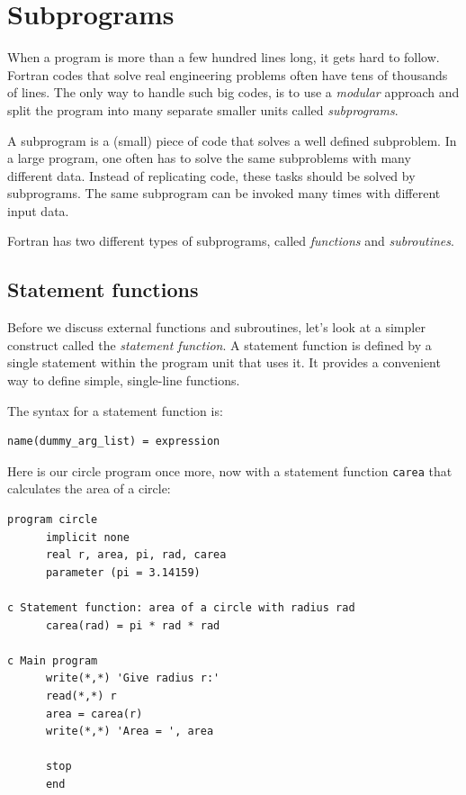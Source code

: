 \chapter{Subprograms}

When a program is more than a few hundred lines long, it gets hard to follow. Fortran codes that solve real engineering problems often have tens of thousands of lines. The only way to handle such big codes, is to use a \emph{modular} approach and split the program into many separate smaller units called \emph{subprograms}.

A subprogram is a (small) piece of code that solves a well defined subproblem. In a large program, one often has to solve the same subproblems with many different data. Instead of replicating code, these tasks should be solved by subprograms. The same subprogram can be invoked many times with different input data.

Fortran has two different types of subprograms, called \emph{functions} and \emph{subroutines}.

\section{Statement functions}

Before we discuss external functions and subroutines, let's look at a simpler construct called the \emph{statement function}. A statement function is defined by a single statement within the program unit that uses it. It provides a convenient way to define simple, single-line functions.

The syntax for a statement function is:

\begin{lstlisting}[style=fortran77]
      name(dummy_arg_list) = expression
\end{lstlisting}

Here is our circle program once more, now with a statement function \texttt{carea} that calculates the area of a circle:

\begin{lstlisting}[style=fortran77]
      program circle
      implicit none
      real r, area, pi, rad, carea
      parameter (pi = 3.14159)

c Statement function: area of a circle with radius rad
      carea(rad) = pi * rad * rad

c Main program
      write(*,*) 'Give radius r:'
      read(*,*) r
      area = carea(r)
      write(*,*) 'Area = ', area

      stop
      end
\end{lstlisting}

